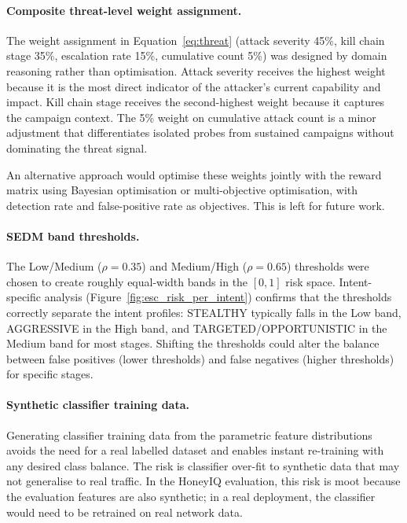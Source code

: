 \paragraph{Composite threat-level weight assignment.}
The weight assignment in Equation~\ref{eq:threat} (attack severity 45\%,
kill chain stage 35\%, escalation rate 15\%, cumulative count 5\%) was
designed by domain reasoning rather than optimisation.
Attack severity receives the highest weight because it is the most direct
indicator of the attacker's current capability and impact.
Kill chain stage receives the second-highest weight because it captures the
campaign context.
The 5\% weight on cumulative attack count is a minor adjustment that
differentiates isolated probes from sustained campaigns without dominating
the threat signal.

An alternative approach would optimise these weights jointly with the reward
matrix using Bayesian optimisation or multi-objective optimisation, with
detection rate and false-positive rate as objectives.
This is left for future work.

\paragraph{SEDM band thresholds.}
The Low/Medium ($\rho = 0.35$) and Medium/High ($\rho = 0.65$) thresholds
were chosen to create roughly equal-width bands in the $[0, 1]$ risk space.
Intent-specific analysis (Figure~\ref{fig:esc_risk_per_intent}) confirms
that the thresholds correctly separate the intent profiles: STEALTHY
typically falls in the Low band, AGGRESSIVE in the High band, and
TARGETED/OPPORTUNISTIC in the Medium band for most stages.
Shifting the thresholds could alter the balance between false positives
(lower thresholds) and false negatives (higher thresholds) for specific
stages.

\paragraph{Synthetic classifier training data.}
Generating classifier training data from the parametric feature distributions
avoids the need for a real labelled dataset and enables instant re-training
with any desired class balance.
The risk is classifier over-fit to synthetic data that may not generalise
to real traffic.
In the HoneyIQ evaluation, this risk is moot because the evaluation features
are also synthetic; in a real deployment, the classifier would need to be
retrained on real network data.

